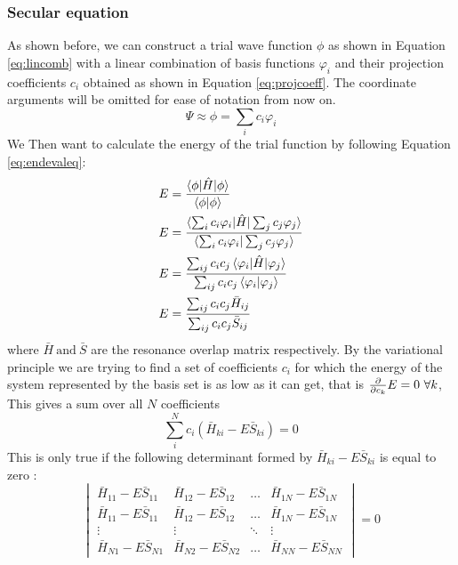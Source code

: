 \documentclass[../master_thesis.tex]{subfiles}
\begin{document}
\subsubsection{Secular equation}

As shown before, we can construct a trial wave function $\phi$ as shown in Equation
\ref{eq:lincomb} with a linear combination of basis functions $\varphi_i$ and
their projection coefficients $c_i$ obtained as shown in Equation \ref{eq:projcoeff}.
The coordinate arguments will be omitted for ease of notation from now on.
\begin{equation}
  \Psi \approx \phi = \sum_i c_i \varphi_i
\end{equation}
 We Then want to calculate the energy of the trial function by following Equation
 \ref{eq:endevaleq}\cite{Cramer:2004}:
 \begin{align}
   \begin{split}
     E &= \frac{\braket{\phi|\hat{H}|\phi}}{\braket{\phi|\phi}} \\
     E &= \frac{\braket{\sum_i c_i \varphi_i|\hat{H}|\sum_j c_j \varphi_j}}{\braket{\sum_i c_i \varphi_i|\sum_j c_j \varphi_j}} \\
     E &= \frac{\sum_{ij} c_i c_j \braket{\varphi_i|\hat{H}|\varphi_j}}{\sum_{ij}c_i c_j\braket{\varphi_i|\varphi_j}}\\
     E &= \frac{\sum_{ij} c_i c_j\bar{H}_{ij}}{\sum_{ij} c_i c_j\bar{S}_{ij}}
   \end{split}
 \end{align}
where $\bar{H}\ \text{and} \ \bar{S}$ are the resonance overlap matrix respectively.
By the variational principle we are trying to find a set of coefficients $c_i$
for which the energy of the system represented by the basis set is as low as it
can get, that is $\diff{c_k}E = 0 \ \forall k $, This gives a sum over all $N$
coefficients \cite{Cramer:2004}
\begin{equation}\label{eq:linearci}
  \sum_{i}^N c_i (\bar{H}_{ki} - E\bar{S}_{ki}) = 0
\end{equation}
This is only true if the following determinant formed by $\bar{H}_{ki} - E\bar{S}_{ki}$
is equal to zero \cite{Cramer:2004}:
\begin{equation}\label{eq:seceq}
  \begin{vmatrix}
    \bar{H}_{11} - E\bar{S}_{11} & \bar{H}_{12} - E\bar{S}_{12} & \ldots & \bar{H}_{1N} - E\bar{S}_{1N} \\
    \bar{H}_{11} - E\bar{S}_{11} & \bar{H}_{12} - E\bar{S}_{12} & \ldots & \bar{H}_{1N} - E\bar{S}_{1N} \\
    \vdots & \vdots & \ddots & \vdots\\
    \bar{H}_{N1} - E\bar{S}_{N1} & \bar{H}_{N2} - E\bar{S}_{N2} & \ldots & \bar{H}_{NN} - E\bar{S}_{NN}
  \end{vmatrix} = 0
\end{equation}
\end{document}
